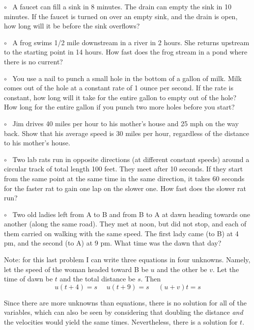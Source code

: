 \documentclass[11pt, oneside]{article}
\begin{document}
$\circ$ \ A faucet can fill a sink in 8 minutes.  The drain can empty the sink in 10 minutes.  If the faucet is turned on over an empty sink, and the drain is open, how long will it be before the sink overflows?

$\circ$ \ A frog swims 1/2 mile downstream in a river in 2 hours.  She returns upstream to the starting point in 14 hours.  How fast does the frog stream in a pond where there is no current?

$\circ$ \ You use a nail to punch a small hole in the bottom of a gallon of milk.  Milk comes out of the hole at a constant rate of 1 ounce per second.  If the rate is constant, how long will it take for the entire gallon to empty out of the hole?  How long for the entire gallon if you punch two more holes before you start?

$\circ$ \ Jim drives 40 miles per hour to his mother's house and 25 mph on the way back.  Show that his average speed is 30 miles per hour, regardless of the distance to his mother's house.

$\circ$ \ Two lab rats run in opposite directions (at different constant speeds) around a circular track of total length 100 feet.  They meet after 10 seconds.  If they start from the same point at the same time in the same direction, it takes 60 seconds for the faster rat to gain one lap on the slower one.  How fast does the slower rat run?

$\circ$ \ Two old ladies left from A to B and from B to A at dawn heading towards one another (along the same road). They met at noon, but did not stop, and each of them carried on walking with the same speed. The first lady came (to B) at 4 pm, and the second (to A) at 9 pm. What time was the dawn that day?

Note:  for this last problem I can write three equations in four unknowns.  Namely, let the speed of the woman headed toward B be $u$ and the other be $v$.  Let the time of dawn be $t$ and the total distance be $s$.  Then
\[ u(t + 4) = s \ \ \ \ \ \ u(t + 9) = s \ \ \ \ \ \ (u + v)t = s \]

Since there are more unknowns than equations, there is no solution for all of the variables, which can also be seen by considering that doubling the distance \emph{and} the velocities would yield the same times.  Nevertheless, there is a solution for $t$.
\end{document}
